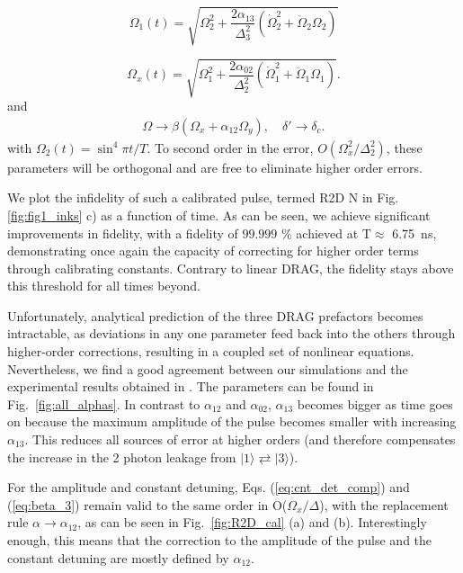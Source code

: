 \documentclass[superscriptaddress,amsmath,amssymb,aps,twocolumn,praplied,notitlepage]{revtex4-2}
\newcommand{\ket}[1]{\vert #1 \rangle}
\begin{document}
\begin{equation}
\label{eq:recursion13}
    \Omega_1(t) = \sqrt{\Omega_2^2+\frac{2\alpha_{13}}{\Delta_3^2}(\dot{\Omega}^2_2+\ddot{\Omega}_2\Omega_2)}
\end{equation}

\begin{equation}
    \Omega_x(t)=\sqrt{\Omega_1^2+\frac{2\alpha_{02}}{\Delta_2^2}(\dot{\Omega}_1^2+\ddot{\Omega}_1\Omega_1)}.
    \label{eq:R1Dopt}
\end{equation}
and \begin{eqnarray}
\label{eq:r2d_num}
\Omega \rightarrow \beta (\Omega_x+\alpha_{12} \Omega_y),\quad \delta' \rightarrow \delta_c.
\end{eqnarray}
with $\Omega_2(t)=\sin^4{\pi t/T}$. To second order in the error, $O({\Omega_x^2}/{\Delta_2^2})$, these parameters will be orthogonal and are free to eliminate higher order errors.

{We plot the infidelity of such a calibrated pulse, termed R2D N in Fig. \ref{fig:fig1_inks} c)} as a function of time. As can be seen, we achieve significant improvements in fidelity, with a fidelity of $99.999$ \% achieved at T$\approx$ 6.75~ns, demonstrating once again the capacity of correcting for higher order terms through calibrating constants. Contrary to linear DRAG, the fidelity stays above this threshold for all times beyond.

Unfortunately, analytical prediction of the three DRAG prefactors becomes intractable, as deviations in any one parameter feed back into the others through higher-order corrections, resulting in a coupled set of nonlinear equations.
Nevertheless, we find a good agreement between our simulations and the experimental results obtained in \cite{GAO2025}.
The parameters can be found in Fig.~\ref{fig:all_alphas}. In contrast to $\alpha_{12}$ and $\alpha_{02}$, $\alpha_{13}$ becomes bigger as time goes on because the maximum amplitude of the pulse becomes smaller with increasing $\alpha_{13}$. This reduces all sources of error at higher orders (and therefore compensates the increase in the 2 photon leakage from $\ket{1} \rightleftarrows\ket{3}$).

For the amplitude and constant detuning, Eqs. (\ref{eq:cnt_det_comp}) and (\ref{eq:beta_3}) remain valid to the same order in O($\Omega_x/\Delta$), with the replacement rule $\alpha \rightarrow \alpha_{12}$, as can be seen in Fig.~\ref{fig:R2D_cal} (a) and (b). Interestingly enough, this means that the correction to the amplitude of the pulse and the constant detuning are mostly defined by $\alpha_{12}$.
\end{document}
